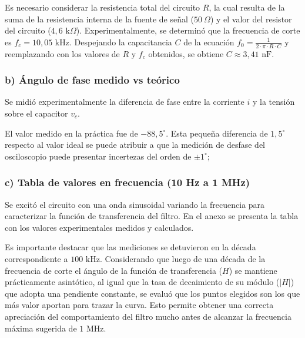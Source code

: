 \documentclass{article}
\begin{document}
        
                    Es necesario considerar la resistencia total del circuito $R$,
                     la cual resulta de la suma de la resistencia interna de la fuente de señal
                      ($50\ \Omega$) y el valor del resistor del circuito ($4,6\text{ k}\Omega$).
                    Experimentalmente, se determinó que la frecuencia de corte es $f_c = 10,05\text{ kHz}$. Despejando 
                    la capacitancia $C$ de la ecuación $ f_0 = \frac{1}{2 \cdot \pi \cdot R \cdot C} $ y reemplazando con los valores de $R$ y $f_c$ obtenidos, se obtiene $C \approx 3,41\text{ nF}$.

                \subsubsection*{b) Ángulo de fase medido vs teórico}
        
                    Se midió experimentalmente la diferencia de fase entre la corriente $i$
                     y la tensión sobre el capacitor $v_c$.
        
                    El valor medido en la práctica fue de $-88,5^\circ$. Esta pequeña diferencia
                     de $1,5^\circ$ respecto al valor ideal se puede atribuir a que la medición de desfase del osciloscopio
                         puede presentar incertezas del orden de $\pm 1^\circ$; 
        

                \subsubsection*{c) Tabla de valores en frecuencia (10 Hz a 1 MHz)}
        
                    Se excitó el circuito con una onda sinusoidal variando la frecuencia para caracterizar la función de transferencia del filtro. 
                    En el anexo se presenta la tabla con los valores experimentales medidos y calculados.
        
                    Es importante destacar que las mediciones se detuvieron en la década 
                    correspondiente a $100\text{ kHz}$. Considerando que luego de una década de la frecuencia de corte el ángulo de la función de transferencia ($H$)
                     se mantiene prácticamente asintótico, al igual que la tasa de decaimiento de su módulo ($|H|$) que adopta una pendiente constante, se evaluó que los puntos elegidos son los que más valor aportan para trazar la curva. Esto permite obtener una correcta apreciación del comportamiento del filtro mucho antes de alcanzar la frecuencia máxima sugerida de $1\text{ MHz}$. 
\end{document}

